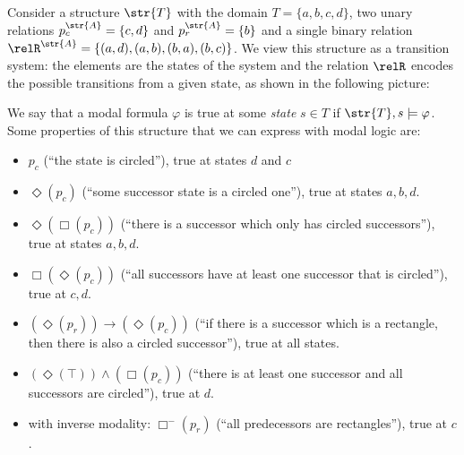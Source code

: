 \begin{example}
  Consider a structure $\str{T}$ with the domain $T = \{ a,b,c,d \}$, two unary relations $p_{c}^{\str{A}} = \{c,d\}$ and $p_{r}^{\str{A}} = \{ b \}$ and a single binary relation $\relR^{\str{A}} = \{ (a,d), (a,b), (b,a), (b,c) \}$. We view this structure as a transition system: the elements are the states of the system and the relation $\relR$ encodes the possible transitions from a given state, as shown in the following picture:
  \begin{center}
  
  \end{center}
  We say that a modal formula $\varphi$ is true at some \emph{state} $s \in T$ if $\str{T}, s \models \varphi$.
  Some properties of this structure that we can express with modal logic are:
  \begin{itemize}
    \item $p_{c}$ (``the state is circled''), true at states $d$ and $c$
    \item $\Diamond(p_{c})$ (``some successor state is a circled one''), true at states $a, b, d$.
    \item $\Diamond(\Box(p_{c}))$ (``there is a successor which only has circled successors''), true at states $a, b, d$.
    \item $\Box(\Diamond(p_{c}))$ (``all successors have at least one successor that is circled''), true at $c,d$.
    \item $(\Diamond(p_{r})) \to (\Diamond(p_{c}))$ (``if there is a successor which is a rectangle, then there is also a circled successor''), true at all states.
    \item $(\Diamond(\top)) \land (\Box(p_{c}))$ (``there is at least one successor and all successors are circled''), true at $d$.
    \item with inverse modality: $\Box^{-}(p_{r})$ (``all predecessors are rectangles''), true at $c$.
  \end{itemize}
\end{example}

